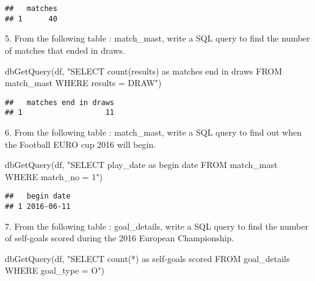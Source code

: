 \documentclass[
]{article}
\newenvironment{Shaded}{\begin{snugshade}}{\end{snugshade}}
\newcommand{\FunctionTok}[1]{\textcolor[rgb]{0.00,0.00,0.00}{#1}}
\newcommand{\NormalTok}[1]{#1}
\newcommand{\StringTok}[1]{\textcolor[rgb]{0.31,0.60,0.02}{#1}}
\begin{document}
\begin{verbatim}
##   matches
## 1      40
\end{verbatim}

5. From the following table : match\_mast, write a SQL query to find the
number of matches that ended in draws.

\begin{Shaded}
\begin{Highlighting}[]
\FunctionTok{dbGetQuery}\NormalTok{(df, }\StringTok{"SELECT count(results) as \textquotesingle{}matches end in draws\textquotesingle{}}
\StringTok{                FROM match\_mast}
\StringTok{                WHERE results = \textquotesingle{}DRAW\textquotesingle{}"}\NormalTok{)}
\end{Highlighting}
\end{Shaded}

\begin{verbatim}
##   matches end in draws
## 1                   11
\end{verbatim}

6. From the following table : match\_mast, write a SQL query to find out
when the Football EURO cup 2016 will begin.

\begin{Shaded}
\begin{Highlighting}[]
\FunctionTok{dbGetQuery}\NormalTok{(df, }\StringTok{"SELECT play\_date as \textquotesingle{}begin date\textquotesingle{}}
\StringTok{                FROM match\_mast}
\StringTok{                WHERE match\_no = 1"}\NormalTok{)}
\end{Highlighting}
\end{Shaded}

\begin{verbatim}
##   begin date
## 1 2016-06-11
\end{verbatim}

7. From the following table : goal\_details, write a SQL query to find
the number of self-goals scored during the 2016 European Championship.

\begin{Shaded}
\begin{Highlighting}[]
\FunctionTok{dbGetQuery}\NormalTok{(df, }\StringTok{"SELECT count(*) as \textquotesingle{}self{-}goals scored\textquotesingle{}}
\StringTok{                FROM goal\_details}
\StringTok{                WHERE goal\_type = \textquotesingle{}O\textquotesingle{}"}\NormalTok{)}
\end{Highlighting}
\end{Shaded}
\end{document}
